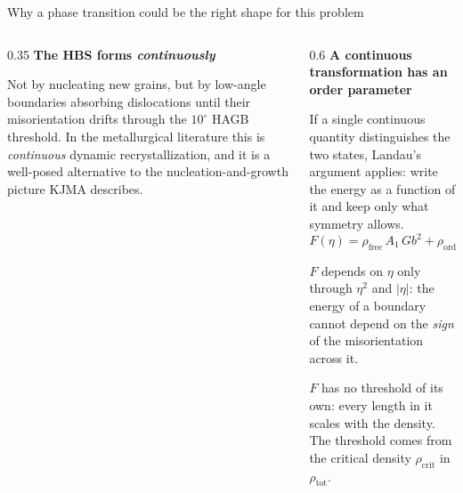 \documentclass[10pt,aspectratio=169]{beamer}
\begin{document}
\begin{frame}{Why a phase transition could be the right shape for this problem}
  \begin{columns}
    \begin{column}{0.35\textwidth}
      \textbf{The HBS forms \emph{continuously}}

      \small
      Not by nucleating new grains, but by low-angle boundaries absorbing dislocations until
      their misorientation drifts through the $10^\circ$ HAGB threshold. In the metallurgical
      literature this is \emph{continuous} dynamic recrystallization, and it is a well-posed
      alternative to the nucleation-and-growth picture KJMA describes.\footnotemark[5]

    \end{column}
    \begin{column}{0.6\textwidth}
      \textbf{A continuous transformation has an order parameter}

      \small
      If a single continuous quantity distinguishes the two states, Landau's argument applies: write the energy as a function of it and keep only what symmetry allows.\footnotemark[6]
      \[ F(\eta) = \rho_{\text{free}}\,A_1\,Gb^2 + \rho_{\text{ord}}(\eta)\,A_2(\eta)\,Gb^2 \]

      $F$ depends on $\eta$ only through $\eta^2$ and $|\eta|$: the energy of a boundary cannot
      depend on the \emph{sign} of the misorientation across it. 

      \vspace{0.4em}
      $F$ has no threshold of its own: every length in it scales with the density. The
      threshold comes from the critical density $\rho_{\text{crit}}$ in $\rho_{\text{tot}}$.
    \end{column}
  \end{columns}

\end{frame}
\end{document}
